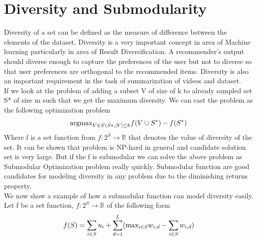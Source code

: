 \documentclass[a4paper,twoside]{iiththesis}
\theoremstyle{definition}
\theoremstyle{definition}
\theoremstyle{remark}
\begin{document}
\section{Diversity and Submodularity}

Diversity of a set can be defined as the measure of difference between the elements of the dataset.  Diversity is a very important concept in area of Machine learning particularly in area of Result Diversification. A recommender's output should diverse enough to capture the preferences of the user but not to diverse so that user preferences are orthogonal to the recommended items. Diversity is also an important requirement in the task of summarization of videos and dataset. \\
If we look at the problem of adding a subset V of size of k to already sampled set S* of size m such that we get the maximum diversity. We can cast the problem as the following optimization problem
\begin{equation}\label{diversitynphard}
\text{argmax}_{V \in S\setminus S*, |V|\leq k}\space f(V\cup S^*) - f(S^*)
\end{equation}
Where f is a set function from $f:2^S \rightarrow \mathbb{R}$ that denotes the value of diversity of the set. It can be shown that problem is NP-hard in general and candidate solution set is very large. But if the f is submodular we can solve the above problem as Submodular Optimization problem really quickly. Submodular function are good candidates for modeling diversity in any problem due to the diminishing returns property.\\

We now show a example\cite{tschiatschek2016learning} of how a submodular function can model diversity easily. 
Let f be a set function, $f : 2^S \rightarrow \mathbb{R}$ of the following form 
\begin{equation}\label{Diversity2}
	f(S) = \sum_{i\in S} u_i + \sum_{d=1}^L (\text{max}_{i\in S} \space w_{i, d} - \sum_{i \in S} w_{i, d} )
\end{equation}
\end{document}

